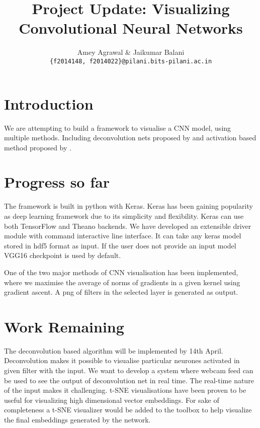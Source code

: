 \documentclass{article} %
\title{ Project Update: Visualizing Convolutional Neural
Networks }
\author{
Amey Agrawal \& Jaikumar Balani \\
\texttt{\{f2014148, f2014022\}@pilani.bits-pilani.ac.in} \\
}
\begin{document}
\maketitle

\section{Introduction}

We are attempting to build a framework to visualise a CNN model,
using multiple methods. Including deconvolution nets
proposed by \citet{zeiler2014visualizing} and activation based method
proposed by \citet{erhan2009visualizing}.


\section{Progress so far}

The framework is built in python with Keras. Keras has been gaining popularity
as deep learning framework due to its simplicity and flexibility. Keras can use
both TensorFlow and Theano backends. We have developed an extensible driver
module with command interactive line interface. It can take any keras model
stored in hdf5 format as input. If the user does not provide an input model VGG16
checkpoint is used by default.

One of the two major methods of CNN visualisation has been implemented, where
we maximise the average of norms of gradients in a given kernel using gradient
ascent. A png of filters in the selected layer is generated as output.

\section{Work Remaining}

The deconvolution based algorithm will be implemented by 14th April.
Deconvolution makes it possible to visualise particular neurones activated in
given filter with the input. We want to develop a system where webcam feed can be used
to see the output of deconvolution net in real time. The real-time nature of the
input makes it challenging. t-SNE visualisations have been proven to be
useful for visualizing high dimensional vector embeddings. For sake of
completeness a t-SNE visualizer would be added to the toolbox to help
visualize the final embeddings generated by the network.




\end{document}
